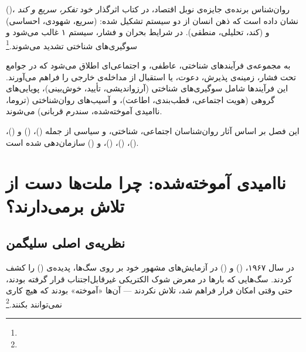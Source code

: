  ()، روان‌شناس برنده‌ی جایزه‌ی نوبل اقتصاد، در کتاب اثرگذار خود \textit{تفکر، سریع و کند} نشان داده است که ذهن انسان از دو سیستم تشکیل شده:  (سریع، شهودی، احساسی) و  (کند، تحلیلی، منطقی). در شرایط بحران و فشار، سیستم ۱ غالب می‌شود و سوگیری‌های شناختی تشدید می‌شوند.\footnote{}

\begin{tcolorbox}[defbox, title={مفهوم کلیدی: روان‌شناسی سیاسی نجات‌طلبی}]
 به مجموعه‌ی فرآیندهای شناختی، عاطفی، و اجتماعی‌ای اطلاق می‌شود که در جوامع تحت فشار، زمینه‌ی پذیرش، دعوت، یا استقبال از مداخله‌ی خارجی را فراهم می‌آورند. این فرآیندها شامل سوگیری‌های شناختی (آرزواندیشی، تأیید، خوش‌بینی)، پویایی‌های گروهی (هویت اجتماعی، قطب‌بندی، اطاعت)، و آسیب‌های روان‌شناختی (تروما، ناامیدی آموخته‌شده، سندرم قربانی) می‌شوند.
\end{tcolorbox}

این فصل بر اساس آثار روان‌شناسان اجتماعی، شناختی، و سیاسی از جمله  ()،  () و  ()،  ()،  ()،  ()، و  () سازمان‌دهی شده است.


\section{ناامیدی آموخته‌شده: چرا ملت‌ها دست از تلاش برمی‌دارند؟}
\label{sec:ch11-learned-helplessness}

\subsection{نظریه‌ی اصلی سلیگمن}
\label{subsec:ch11-seligman-theory}

در سال ۱۹۶۷،  () و  () در آزمایش‌های مشهور خود بر روی سگ‌ها، پدیده‌ی  () را کشف کردند. سگ‌هایی که بارها در معرض شوک الکتریکی غیرقابل‌اجتناب قرار گرفته بودند، حتی وقتی امکان فرار فراهم شد، تلاش نکردند — آن‌ها «آموخته» بودند که هیچ کاری نمی‌توانند بکنند.\footnote{}

